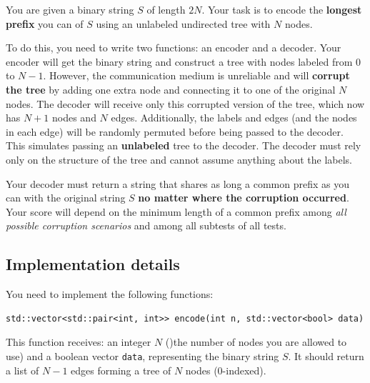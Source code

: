 \documentclass[12pt]{article}
\begin{document}
\renewcommand{\headerLang}{English}
\renewcommand{\problemName}{A12. Bits and Tree}

\renewcommand{\headerLeft}{IATI Day 1, Senior group}
\renewcommand{\headerRightFirst}{XVI INTERNATIONAL ADVANCED TOURNAMENT IN INFORMATICS}
\renewcommand{\headerRightSecond}{SHUMEN 2025}

\renewcommand{\tl}{$15.00$ s}
\renewcommand{\ml}{$2048$ MB}
\problem{Task \problemName}

You are given a binary string \( S \) of length \( 2N \). Your task is to encode the \textbf{longest prefix} you can of \( S \) using an unlabeled undirected tree with \( N \) nodes.

To do this, you need to write two functions: an encoder and a decoder. Your encoder will get the binary string and construct a tree with nodes labeled from \( 0 \) to \( N - 1 \). However, the communication medium is unreliable and will \textbf{corrupt the tree} by adding one extra node and connecting it to one of the original \( N \) nodes. The decoder will receive only this corrupted version of the tree, which now has \( N + 1 \) nodes and \( N \) edges. Additionally, the labels and edges (and the nodes in each edge) will be randomly permuted before being passed to the decoder. This simulates passing an \textbf{unlabeled} tree to the decoder. The decoder must rely only on the structure of the tree and cannot assume anything about the labels.

Your decoder must return a string that shares as long a common prefix as you can with the original string \( S \) \textbf{no matter where the corruption occurred}. Your score will depend on the minimum length of a common prefix among \textit{all possible corruption scenarios} and among all subtests of all tests.

\subsection{Implementation details}

You need to implement the following functions:

\begin{verbatim}
std::vector<std::pair<int, int>> encode(int n, std::vector<bool> data)
\end{verbatim}

This function receives: an integer $N$ ()the number of nodes you are allowed to use) and a boolean vector \texttt{data}, representing the binary string $S$. It should return a list of $N - 1$ edges forming a tree of $N$ nodes (0-indexed).
\end{document}
